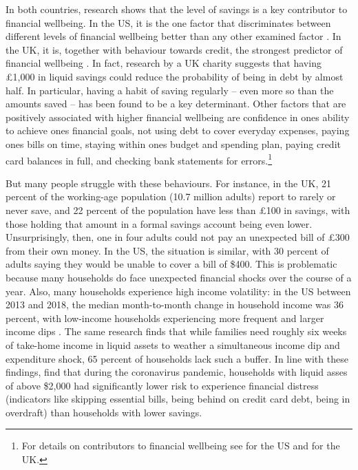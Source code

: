 In both countries, research shows that the level of savings is a key
contributor to financial wellbeing. In the US, it is the one factor that
discriminates between different levels of financial wellbeing better than any
other examined factor \citep{cfpb2017financial}. In the UK, it is, together
with behaviour towards credit, the strongest predictor of financial wellbeing
\citep{mps2018building}. In fact, research by a UK charity suggests that having
\pounds1,000 in liquid savings could reduce the probability of being in debt by
almost half. In particular, having a habit of saving regularly -- even more so
than the amounts saved -- has been found to be a key determinant. Other
factors that are positively associated with higher financial wellbeing are
confidence in ones ability to achieve ones financial goals, not using debt to
cover everyday expenses, paying ones bills on time, staying within ones budget
and spending plan, paying credit card balances in full, and checking bank
statements for errors.\footnote{For details on contributors to financial
wellbeing see \citep{cfpb2017financial} for the US and \citet{mps2018building}
for the UK.}

But many people struggle with these behaviours. For instance, in the UK, 21
percent of the working-age population (10.7 million adults) report to rarely or
never save, and 22 percent of the population have less than \pounds100 in
savings, with those holding that amount in a formal savings account being even
lower. Unsurprisingly, then, one in four adults could not pay an unexpected
bill of \pounds300 from their own money. In the US, the situation is similar,
with 30 percent of adults saying they would be unable to cover a bill of \$400.
This is problematic because many households do face unexpected financial shocks
over the course of a year. Also, many households experience high income
volatility: in the US between 2013 and 2018, the median month-to-month change
in household income was 36 percent, with low-income households experiencing
more frequent and larger income dips \citep{jpmorgan2019weathering}. The same
research finds that while families need roughly six weeks of take-home income
in liquid assets to weather a simultaneous income dip and expenditure shock, 65
percent of households lack such a buffer. In line with these findings,
\citet{roll2020income} find that during the coronavirus pandemic, households
with liquid asses of above \$2,000 had significantly lower risk to experience
financial distress (indicators like skipping essential bills, being behind on
credit card debt, being in overdraft) than households with lower savings.

